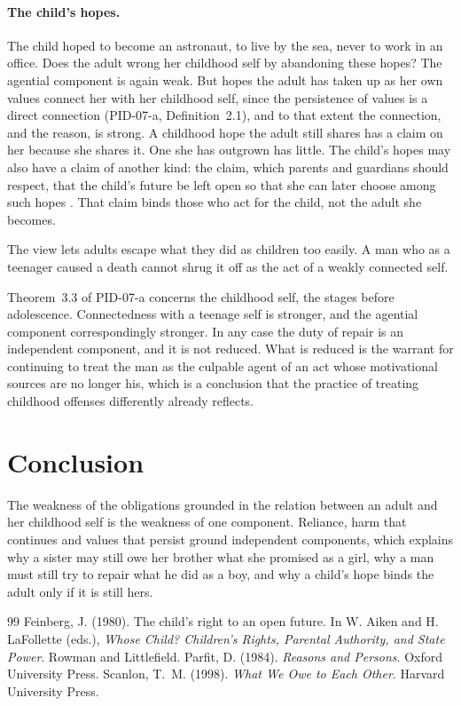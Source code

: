 \documentclass{situationist-preprint}
\begin{document}
\paragraph{The child's hopes.} The child hoped to become an astronaut, to live by the sea, never to work in an office. Does the adult wrong her childhood self by abandoning these hopes? The agential component is again weak. But hopes the adult has taken up as her own values connect her with her childhood self, since the persistence of values is a direct connection (PID-07-a, Definition~2.1), and to that extent the connection, and the reason, is strong. A childhood hope the adult still shares has a claim on her because she shares it. One she has outgrown has little. The child's hopes may also have a claim of another kind: the claim, which parents and guardians should respect, that the child's future be left open so that she can later choose among such hopes \citep{Feinberg1980}. That claim binds those who act for the child, not the adult she becomes.

\begin{objection}
The view lets adults escape what they did as children too easily. A man who as a teenager caused a death cannot shrug it off as the act of a weakly connected self.
\end{objection}

\begin{reply}
Theorem~3.3 of PID-07-a concerns the childhood self, the stages before adolescence. Connectedness with a teenage self is stronger, and the agential component correspondingly stronger. In any case the duty of repair is an independent component, and it is not reduced. What is reduced is the warrant for continuing to treat the man as the culpable agent of an act whose motivational sources are no longer his, which is a conclusion that the practice of treating childhood offenses differently already reflects.
\end{reply}

\section{Conclusion}

The weakness of the obligations grounded in the relation between an adult and her childhood self is the weakness of one component. Reliance, harm that continues and values that persist ground independent components, which explains why a sister may still owe her brother what she promised as a girl, why a man must still try to repair what he did as a boy, and why a child's hope binds the adult only if it is still hers.

\begin{thebibliography}{99}\small
{} Feinberg, J. (1980). The child's right to an open future. In W. Aiken and H. LaFollette (eds.), \emph{Whose Child? Children's Rights, Parental Authority, and State Power}. Rowman and Littlefield.
 Parfit, D. (1984). \emph{Reasons and Persons}. Oxford University Press.
 Scanlon, T.~M. (1998). \emph{What We Owe to Each Other}. Harvard University Press.
\end{thebibliography}
\end{document}
